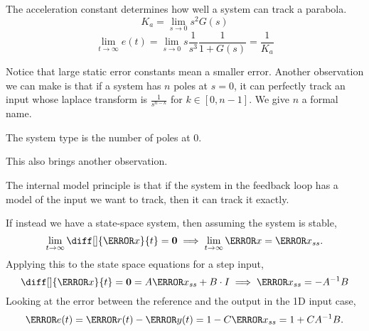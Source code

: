 \begin{definition}
  The acceleration constant determines how well a system can track a parabola.
  \begin{equation}
	K_a = \lim_{s\to0}s^2G(s)
	\label{eqn:acceleration-constant}
  \end{equation}
  \[
	\lim_{t\to\infty} e(t) = \lim_{s\to0} s \frac{1}{s^3} \frac{1}{1+G(s)} = \frac{1}{K_a}
  \]
  \label{defn:acceleration-constant}
\end{definition}
Notice that large static error constants mean a smaller error.
Another observation we can make is that if a system has $n$ poles at $s=0$, it can perfectly track an input whose laplace transform is $\frac{1}{s^{n-k}}$ for $k\in[0, n-1]$. We give $n$ a formal name.
\begin{definition}
  The system type is the number of poles at 0.
  \label{defn:system-type}
\end{definition}
This also brings another observation.
\begin{definition}
  The internal model principle is that if the system in the feedback loop has a model of the input we want to track, then it can track it exactly.
  \label{defn:interal-model}
\end{definition}
If instead we have a state-space system, then assuming the system is stable,
\[
  \lim_{t\to\infty}\diff[]{\V{x}}{t} = \bs{0} \implies \lim_{t\to\infty}\V{x} = \V{x}_{ss}.
\]
Applying this to the state space equations for a step input,
\begin{equation}
  \diff[]{\V{x}}{t} = \bs{0} = A\V{x}_{ss} + B\cdot I \implies \V{x}_{ss} = -A^{-1}B
  \label{eqn:ss-sse}
\end{equation}
Looking at the error between the reference and the output in the 1D input case,
\[
  \V{e}(t) = \V{r}(t) - \V{y}(t) = 1 - C\V{x}_{ss} = 1 + CA^{-1}B.
\]
